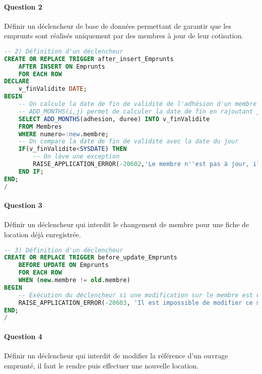 \documentclass[10pt, oneside]{article}
\begin{document}

\paragraph{Question 2} Définir un déclencheur de base de données permettant de garantir que les emprunts sont réalisés uniquement par des membres à jour de leur cotisation.

\begin{lstlisting}[language=sql, title=Question 2, label=QVI2]
-- 2) Définition d'un déclencheur
CREATE OR REPLACE TRIGGER after_insert_Emprunts
	AFTER INSERT ON Emprunts
	FOR EACH ROW
DECLARE
	v_finValidite DATE;
BEGIN
	-- On calcule la date de fin de validité de l'adhésion d'un membre voulant emprunter un exemplaire
	-- ADD_MONTHS(i,j) permet de calculer la date de fin en rajoutant j mois à la date i
	SELECT ADD_MONTHS(adhesion, duree) INTO v_finValidite
	FROM Membres
	WHERE numero=:new.membre;
	-- On compare la date de fin de validité avec la date du jour
	IF(v_finValidite<SYSDATE) THEN
		-- On lève une exception 
		RAISE_APPLICATION_ERROR(-20602,'Le membre n''est pas à jour, il ne peut pas emprunter d''ouvrages');
	END IF;
END;
/
\end{lstlisting}


\paragraph{Question 3} Définir un déclencheur qui interdit le changement de membre pour une fiche de location déjà enregistrée.

\begin{lstlisting}[language=sql, title=Question 3, label=QVI3]
-- 3) Définition d'un déclencheur
CREATE OR REPLACE TRIGGER before_update_Emprunts
	BEFORE UPDATE ON Emprunts
	FOR EACH ROW
	WHEN (new.membre != old.membre)
BEGIN
	-- Exécution du déclencheur si une modification sur le membre est effectuée
	RAISE_APPLICATION_ERROR(-20603, 'Il est impossible de modifier ce membre');
END;
/
\end{lstlisting}


\paragraph{Question 4} Définir un déclencheur qui interdit de modifier la référence d'un ouvrage emprunté, il faut le rendre puis effectuer une nouvelle location.
\end{document}
